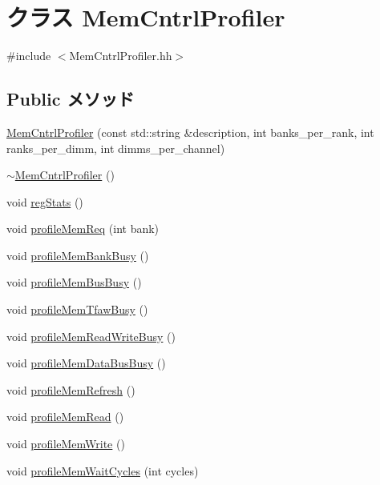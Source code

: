 \hypertarget{classMemCntrlProfiler}{
\section{クラス MemCntrlProfiler}
\label{classMemCntrlProfiler}
}


{\ttfamily \#include $<$MemCntrlProfiler.hh$>$}\subsection*{Public メソッド}
\begin{DoxyCompactItemize}
\item 
\hyperlink{classMemCntrlProfiler_a0675bcfd8eb447c6650b74c4570c2370}{MemCntrlProfiler} (const std::string \&description, int banks\_\-per\_\-rank, int ranks\_\-per\_\-dimm, int dimms\_\-per\_\-channel)
\item 
\hyperlink{classMemCntrlProfiler_a345a0d61dbc5fd08aa4ded24b45612eb}{$\sim$MemCntrlProfiler} ()
\item 
void \hyperlink{classMemCntrlProfiler_a4dc637449366fcdfc4e764cdf12d9b11}{regStats} ()
\item 
void \hyperlink{classMemCntrlProfiler_a640cba10e9673e8081ddc1e8fcf2a0c9}{profileMemReq} (int bank)
\item 
void \hyperlink{classMemCntrlProfiler_acf390d1b60244779949c578e89bd28b4}{profileMemBankBusy} ()
\item 
void \hyperlink{classMemCntrlProfiler_a264503c5439f1643d2c519c4ee8a5086}{profileMemBusBusy} ()
\item 
void \hyperlink{classMemCntrlProfiler_a32ce62393c41865363706bd304a6c376}{profileMemTfawBusy} ()
\item 
void \hyperlink{classMemCntrlProfiler_acb3938ae0f54dbc477209f4437ada024}{profileMemReadWriteBusy} ()
\item 
void \hyperlink{classMemCntrlProfiler_adcebbabdff5cd5a8a99061b8d1d21136}{profileMemDataBusBusy} ()
\item 
void \hyperlink{classMemCntrlProfiler_a40e2dc0236a3bc753d24a2bf77dc3b9f}{profileMemRefresh} ()
\item 
void \hyperlink{classMemCntrlProfiler_aa24e89520b2477766f4955368b1782af}{profileMemRead} ()
\item 
void \hyperlink{classMemCntrlProfiler_ad3a0650ce42e756305da022e6b226051}{profileMemWrite} ()
\item 
void \hyperlink{classMemCntrlProfiler_a1016c2b56b2e6a85e6aba27ec4f574a0}{profileMemWaitCycles} (int cycles)

\end{DoxyCompactItemize}
